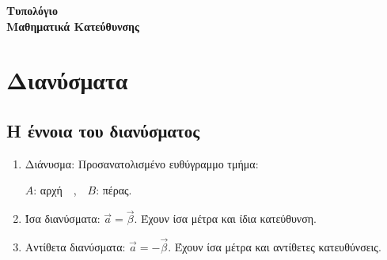 \documentclass[11pt,a4paper]{article}
\begin{document}
\begin{center}
{\LARGE \textbf{Τυπολόγιο}}\\
{\Large \textbf{Μαθηματικά Κατεύθυνσης}}
\end{center}
\section{Διανύσματα}
\subsection{Η έννοια του διανύσματος}
\begin{enumerate}
\item Διάνυσμα: Προσανατολισμένο ευθύγραμμο τμήμα:
\begin{center}
\qquad $ A $: αρχή\ \ ,\ \ $ B $: πέρας.
\end{center}
\item Ίσα διανύσματα: $ \vec{a}=\vec{\beta} $. Έχουν ίσα μέτρα και ίδια κατεύθυνση.
\item Αντίθετα διανύσματα: $ \vec{a}=-\vec{\beta} $. Έχουν ίσα μέτρα και αντίθετες κατευθύνσεις.
\end{enumerate}
\end{document}
